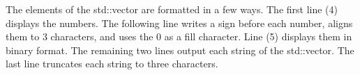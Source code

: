 The elements of the std::vector are formatted in a few ways. The first line (4) displays the numbers. The following line writes a sign before each number, aligns them to 3 characters, and uses the 0 as a fill character. Line (5) displays them in binary format. The remaining two lines output each string of the std::vector. The last line truncates each string to three characters.














































